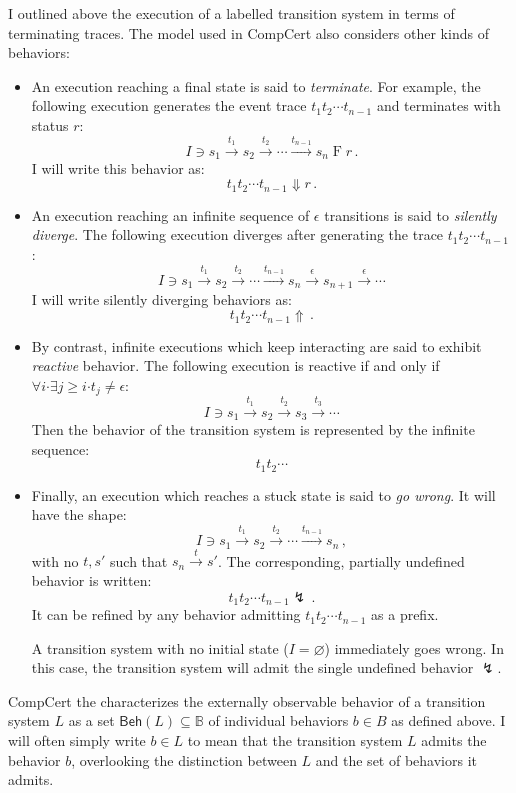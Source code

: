 \documentclass[11pt,oneside,draft]{book}
\theoremstyle{definition}
\newcommand{\kw}[1]{\ensuremath{ \mathsf{#1} }}
\newcommand{\bdot}{\boldsymbol{\cdot}}
\begin{document}
I outlined above the execution of a labelled transition system
in terms of terminating traces.
The model used in CompCert also considers other kinds of behaviors:
\begin{itemize}
\item An execution reaching a final state is said to
    \emph{terminate}.
    For example,
    the following execution generates
    the event trace $t_1 t_2 \cdots t_{n-1}$
    and terminates with status $r$:
    \[
        I \ni s_1 \stackrel{t_1}{\rightarrow}
          s_2 \stackrel{t_2}{\rightarrow}
          \cdots \stackrel{t_{n-1}}{\rightarrow}
          s_n \mathrel{F} r \,.
    \]
    I will write this behavior as:
    \[
      t_1 t_2 \cdots t_{n-1} \Downarrow r
      \,.
    \]
\item An execution reaching
    an infinite sequence of $\epsilon$ transitions
    is said to \emph{silently diverge}.
    The following execution diverges after
    generating the trace $t_1 t_2 \cdots t_{n-1}$:
    \[
        I \ni s_1 \stackrel{t_1}{\rightarrow}
          s_2 \stackrel{t_2}{\rightarrow}
          \cdots \stackrel{t_{n-1}}{\rightarrow}
          s_n \stackrel{\epsilon}{\rightarrow}
          s_{n+1} \stackrel{\epsilon}{\rightarrow}
          \cdots
    \]
    I will write silently diverging behaviors as:
    \[
      t_1 t_2 \cdots t_{n-1} \Uparrow
      \,.
    \]
\item By contrast,
    infinite executions which keep interacting
    are said to exhibit \emph{reactive} behavior.
    The following execution
    is reactive if and only if
    $\forall i \bdot \exists j \ge i \bdot t_j \ne \epsilon$:
    \[
        I \ni s_1 \stackrel{t_1}{\rightarrow}
          s_2 \stackrel{t_2}{\rightarrow}
          s_3 \stackrel{t_3}{\rightarrow}
          \cdots
    \]
    Then the behavior of the transition system
    is represented by the infinite sequence:
    \[
      t_1 t_2 \cdots
    \]
\item Finally, an execution which reaches a stuck state
    is said to \emph{go wrong}. It will have the shape:
    \[
        I \ni s_1 \stackrel{t_1}{\rightarrow}
          s_2 \stackrel{t_2}{\rightarrow}
          \cdots \stackrel{t_{n-1}}{\rightarrow}
          s_n \,,
    \]
    with no $t, s'$ such that
    $s_n \stackrel{t}{\rightarrow} s'$.
    The corresponding, partially undefined behavior is written:
    \[
      t_1 t_2 \cdots t_{n-1} \lightning
      \,.
    \]
    It can be refined by any behavior
    admitting $t_1 t_2 \cdots t_{n-1}$ as a prefix.

    A transition system with no initial state ($I = \varnothing$)
    immediately goes wrong.
    In this case,
    the transition system will admit the single undefined behavior $\lightning$.
\end{itemize}
CompCert the characterizes the externally observable behavior
of a transition system $L$
as a set $\kw{Beh}(L) \subseteq \mathbb{B}$ of
individual behaviors $b \in B$ as defined above.
I will often simply write $b \in L$
to mean that the transition system $L$
admits the behavior $b$,
overlooking the distinction between $L$
and the set of behaviors it admits.
\end{document}
